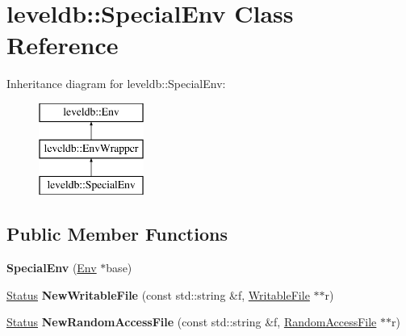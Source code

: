 \hypertarget{classleveldb_1_1_special_env}{}\section{leveldb\+:\+:Special\+Env Class Reference}
\label{classleveldb_1_1_special_env}
Inheritance diagram for leveldb\+:\+:Special\+Env\+:\begin{figure}[H]
\begin{center}
\leavevmode
\includegraphics[height=3.000000cm]{classleveldb_1_1_special_env}
\end{center}
\end{figure}
\subsection*{Public Member Functions}
\begin{DoxyCompactItemize}
\item 
\mbox{\label{classleveldb_1_1_special_env_a29fed9502e35a1f9374e0f46f4bd1181}} 
{\bfseries Special\+Env} (\mbox{\hyperlink{classleveldb_1_1_env}{Env}} $\ast$base)
\item 
\mbox{\label{classleveldb_1_1_special_env_a2a8b88051ccc5f957321d47af0dae5ed}} 
\mbox{\hyperlink{classleveldb_1_1_status}{Status}} {\bfseries New\+Writable\+File} (const std\+::string \&f, \mbox{\hyperlink{classleveldb_1_1_writable_file}{Writable\+File}} $\ast$$\ast$r)
\item 
\mbox{\label{classleveldb_1_1_special_env_ae04ba2b7b94753d805e316dbda74ec00}} 
\mbox{\hyperlink{classleveldb_1_1_status}{Status}} {\bfseries New\+Random\+Access\+File} (const std\+::string \&f, \mbox{\hyperlink{classleveldb_1_1_random_access_file}{Random\+Access\+File}} $\ast$$\ast$r)
\end{DoxyCompactItemize}
